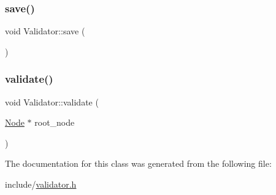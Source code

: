 \mbox{\label{classValidator_a055e6bdb84438449655135b9166bcf2d}} 
\subsubsection{\texorpdfstring{save()}{save()}}
{\footnotesize\ttfamily void Validator\+::save (\begin{DoxyParamCaption}{ }\end{DoxyParamCaption})}

\mbox{\label{classValidator_aa0bc30458ce0255fcec64d8346e384a5}} 
\subsubsection{\texorpdfstring{validate()}{validate()}}
{\footnotesize\ttfamily void Validator\+::validate (\begin{DoxyParamCaption}\item[{\hyperlink{classNode}{Node} $\ast$}]{root\+\_\+node }\end{DoxyParamCaption})}



The documentation for this class was generated from the following file\+:\begin{DoxyCompactItemize}
\item 
include/\hyperlink{validator_8h}{validator.\+h}\end{DoxyCompactItemize}
